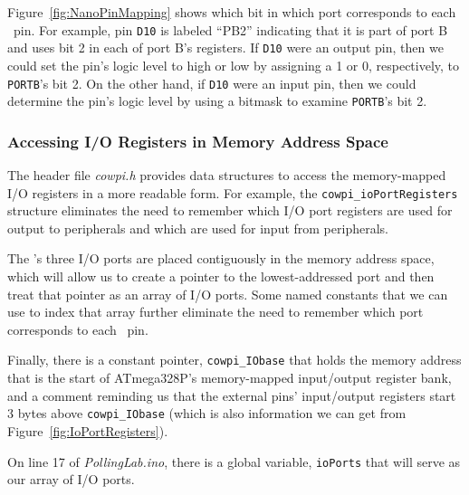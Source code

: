 Figure~\ref{fig:NanoPinMapping} shows which bit in which port corresponds to
each \nano\ pin. For example, pin \texttt{D10} is labeled ``PB2'' indicating
that it is part of port B and uses bit 2 in each of port B's registers. If
\texttt{D10} were an output pin, then we could set the pin's logic level to
high or low by assigning a 1 or 0, respectively, to \texttt{PORTB}'s bit 2.
On the other hand, if \texttt{D10} were an input pin, then we could determine
the pin's logic level by using a bitmask to examine \texttt{PORTB}'s bit 2.

\subsubsection{Accessing I/O Registers in Memory Address Space}

The header file \textit{cowpi.h} provides data structures to access the
memory-mapped I/O registers in a more readable form. For example, the
\lstinline{cowpi_ioPortRegisters} structure eliminates the need to remember
which I/O port registers are used for output to peripherals and which are used
for input from peripherals.



The \nano's three I/O ports are placed contiguously in the memory address space,
which will allow us to create a pointer to the lowest-addressed port and then
treat that pointer as an array of I/O ports. Some named constants that we can
use to index that array further eliminate the need to remember which port
corresponds to each \nano\ pin.



Finally, there is a constant pointer, \lstinline{cowpi_IObase} that holds the
memory address that is the start of ATmega328P's memory-mapped input/output
register bank, and a comment reminding us that the external pins' input/output
registers start 3 bytes above \lstinline{cowpi_IObase} (which is also
information we can get from Figure~\ref{fig:IoPortRegisters}).




On line 17 of \textit{PollingLab.ino}, there is a global variable,
\lstinline{ioPorts} that will serve as our array of I/O ports.

